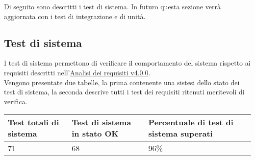 \documentclass{scalatekids-article}
\begin{document}
Di seguito sono descritti i test di sistema. In futuro questa sezione verrà aggiornata con i test di integrazione e di unità.

\subsection{Test di sistema}

I test di sistema permettono di verificare il comportamento del sistema rispetto ai requisiti descritti nell'\href{run:./AnalisiDeiRequisiti\_v4.0.0.pdf}{Analisi dei requisiti v4.0.0}.\\
Vengono presentate due tabelle, la prima contenente una sistesi dello stato dei 
test di sistema, la seconda descrive tutti i test dei requisiti ritenuti meritevoli di verifica. \\

\begin{center}
  \begin{longtable}[H]{| l | l | l |}
    \hline
    Test totali di sistema & Test di sistema in stato OK & Percentuale di test di sistema superati\\
    \hline
    71 & 68 & 96\% \\
    \hline
  \end{longtable}
\end{center}
\end{document}
